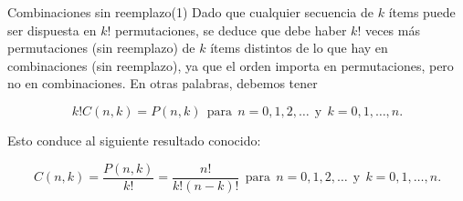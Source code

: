 \documentclass[10pt]{beamer}
\begin{document}
\begin{frame}{Combinaciones sin reemplazo(1)}
Dado que cualquier secuencia de $k$ \'items puede ser dispuesta  en $k!$ permutaciones, se deduce que debe haber $k!$ veces m\'as permutaciones (sin reemplazo) de $k$ \'items  distintos de lo que hay en  combinaciones (sin reemplazo), ya que el orden  importa en permutaciones, pero no en combinaciones. En otras palabras, debemos tener

\[
k!C(n,k) = P(n,k) \ \ \text{para}\ \   n = 0,1,2,\dots \ \ \text{y}\ \  k = 0,1,\dots, n.
\]


Esto conduce al siguiente resultado conocido: 

\[
C(n, k) = \frac{P(n ,k)}{k!} = \frac{n!}{k!(n -k)!}\ \ \text{para}\ \ n = 0, 1, 2, \dots \ \ \text{y}\ \ k = 0,1,\dots, n.
\]

\end{frame}
\end{document}
